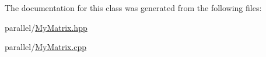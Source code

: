 The documentation for this class was generated from the following files\+:\begin{DoxyCompactItemize}
\item 
parallel/\mbox{\hyperlink{_my_matrix_8hpp}{My\+Matrix.\+hpp}}\item 
parallel/\mbox{\hyperlink{_my_matrix_8cpp}{My\+Matrix.\+cpp}}\end{DoxyCompactItemize}
